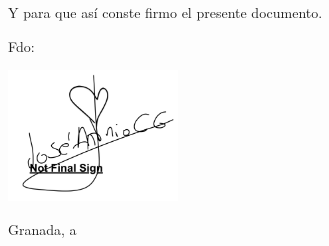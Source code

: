 \begin{minipage}{\textwidth}
    
    \begin{minipage}{\textwidth}
        \bigskip
        Y para que así conste firmo el presente documento.
        \bigskip
        
        
        \noindent Fdo: \nombreAlumno
        
        \includegraphics[width=4.5cm,keepaspectratio]{assets/images/capitulos/general/firma_jose_antonio.png}
    
    \end{minipage}
    
    
    
    \begin{minipage}{\textwidth}
        \vspace{2.4cm}
        \begin{flushright}
        Granada, a \fechaParaHojaDeFirma
        \end{flushright}
    \end{minipage}
    

\end{minipage}



\clearpage\thispagestyle{empty}
